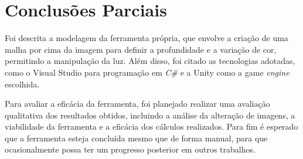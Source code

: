 \chapter{Conclusões Parciais}
\label{cap:05}

Foi descrita a modelagem da ferramenta própria, que envolve a criação de uma malha por cima da imagem para definir a profundidade e a variação de cor, permitindo a manipulação da luz. Além disso, foi citado as tecnologias adotadas, como o Visual Studio para programação em \textit{C\#} e a Unity como a game \textit{engine} escolhida.

Para avaliar a eficácia da ferramenta, foi planejado realizar uma avaliação qualitativa dos resultados obtidos, incluindo a análise da alteração de imagens, a viabilidade da ferramenta e a eficácia dos cálculos realizados. Para fim é esperado que a ferramenta esteja concluída mesmo que de forma manual, para que ocasionalmente possa ter um progresso posterior em outros trabalhos.


